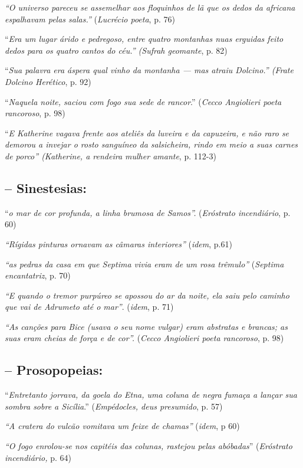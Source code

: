 \documentclass[12pt]{extarticle}
\begin{document}
\emph{``O universo pareceu se assemelhar aos floquinhos de lã que os
dedos da africana espalhavam pelas salas.''} (\emph{Lucrécio poeta}, p.
76)

``\emph{Era um lugar árido e pedregoso, entre quatro montanhas nuas
erguidas feito dedos para os quatro cantos do céu.'' (Sufrah geomante},
p. 82)

``\emph{Sua palavra era áspera qual vinho da montanha --- mas atraiu
Dolcino.'' (Frate Dolcino Herético}, p. 92)

``\emph{Naquela noite, saciou com fogo sua sede de rancor}.''
(\emph{Cecco Angiolieri poeta rancoroso}, p. 98)

``\emph{E Katherine vagava frente aos ateliês da luveira e da capuzeira,
e não raro se demorou a invejar o rosto sanguíneo da salsicheira, rindo
em meio a suas carnes de porco'' (Katherine, a rendeira mulher amante},
p. 112-3)


\subsection{-- Sinestesias:}

``\emph{o mar de cor profunda, a linha brumosa de Samos''.}
(\emph{Eróstrato incendiário}, p. 60)

\emph{``Rígidas pinturas ornavam as câmaras interiores''} (\emph{idem},
p.61)

\emph{``as pedras da casa em que Septima vivia eram de um rosa
trêmulo''} (\emph{Septima encantatriz}, p. 70)

\emph{``E quando o tremor purpúreo se apossou do ar da noite, ela saiu
pelo caminho que vai de Adrumeto até o mar''}. (\emph{idem}, p. 71)

\emph{``As canções para Bice (usava o seu nome vulgar) eram abstratas e
brancas; as suas eram cheias de força e de cor''.} (\emph{Cecco
Angiolieri poeta rancoroso}, p. 98)

\subsection{-- Prosopopeias:}

``\emph{Entretanto jorrava, da goela do Etna, uma coluna de negra fumaça
a lançar sua sombra sobre a Sicília}.'' (\emph{Empédocles, deus
presumido}, p. 57)

\emph{``A cratera do vulcão vomitava um feixe de chamas''} (\emph{idem},
p 60)

\emph{``O fogo enrolou-se nos capitéis das colunas, rastejou pelas
abóbadas}'' (\emph{Eróstrato incendiário,} p. 64)
\end{document}
